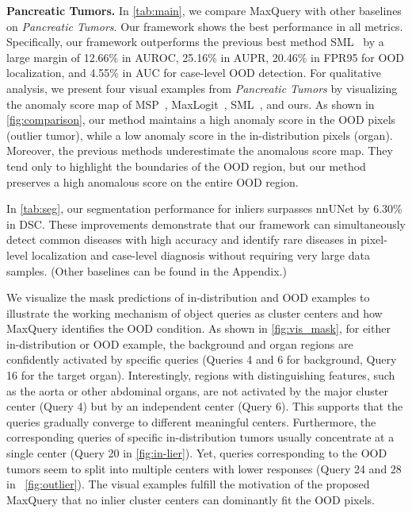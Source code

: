 \documentclass[10pt,twocolumn,letterpaper]{article}
\begin{document}
{\bf Pancreatic Tumors.} In \cref{tab:main}, we compare MaxQuery with other baselines on \textit{Pancreatic Tumors}. %
Our framework shows the best performance in all metrics. Specifically, our framework outperforms the previous best method SML~\cite{jung2021standardized} by a large margin of 12.66\% in AUROC, 25.16\% in AUPR, 20.46\% in FPR95 for OOD localization, and 4.55\% in AUC for case-level OOD detection. For qualitative analysis, we present four visual examples from \textit{Pancreatic Tumors} by visualizing the anomaly score map of MSP~\cite{hendrycks2016baseline}, MaxLogit~\cite{hendrycks2019scaling}, SML~\cite{jung2021standardized}, and ours. As shown in \cref{fig:comparison}, our method maintains a high anomaly score in the OOD pixels (outlier tumor), while a low anomaly score in the in-distribution pixels (organ). Moreover, the previous methods underestimate the anomalous score map. They tend only to highlight the boundaries of the OOD region, but our method preserves a high anomalous score on the entire OOD region. 

In \cref{tab:seg}, our segmentation performance for inliers surpasses nnUNet by 6.30\% in DSC. These improvements demonstrate that our framework can simultaneously detect common diseases with high accuracy and identify rare diseases in pixel-level localization and case-level diagnosis without requiring very large data samples. (Other baselines can be found in the Appendix.)


We visualize the mask predictions of in-distribution and OOD examples to illustrate the working mechanism of object queries as cluster centers and how MaxQuery identifies the OOD condition. As shown in \cref{fig:vis_mask}, for either in-distribution or OOD example, the background and organ regions are confidently activated by specific queries (Queries 4 and 6 for background, Query 16 for the target organ). Interestingly, regions with distinguishing features, such as the aorta or other abdominal organs, are not activated by the major cluster center (Query 4) but by an independent center (Query 6). This supports that the queries gradually converge to different meaningful centers. 
Furthermore, the corresponding queries of specific in-distribution tumors usually concentrate at a single center (Query 20 in \cref{fig:in-lier}). Yet, queries corresponding to the OOD tumors seem to split into multiple centers with lower responses (Query 24 and 28 in ~\cref{fig:outlier}). The visual examples fulfill the motivation of the proposed MaxQuery that no inlier cluster centers can dominantly fit the OOD pixels.
\end{document}
